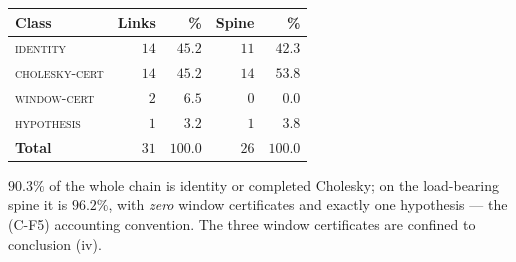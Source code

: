 \documentclass[11pt,a4paper]{article}
\begin{document}
\begin{center}\small
\begin{tabular}{@{}lrrrr@{}}
\toprule
\textbf{Class} & \textbf{Links} & \textbf{\%} & \textbf{Spine} & \textbf{\%}\\
\midrule
\textsc{identity} & $14$ & $45.2$ & $11$ & $42.3$\\
\textsc{cholesky-cert} & $14$ & $45.2$ & $14$ & $53.8$\\
\textsc{window-cert} & $2$ & $6.5$ & $0$ & $0.0$\\
\textsc{hypothesis} & $1$ & $3.2$ & $1$ & $3.8$\\
\midrule
\textbf{Total} & $31$ & $100.0$ & $26$ & $100.0$\\
\bottomrule
\end{tabular}
\end{center}

\noindent $90.3\%$ of the whole chain is identity or completed Cholesky; on the load-bearing spine it
is $\mathbf{96.2\%}$, with \emph{zero} window certificates and exactly one hypothesis --- the
(C-F5) accounting convention. The three window certificates are confined to conclusion (iv).
\end{document}
